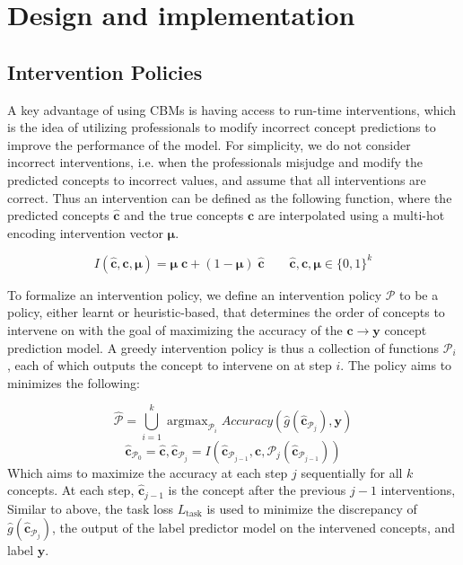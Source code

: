 \documentclass[../main.tex]{subfiles}
\begin{document}
\chapter{Design and implementation}


\section{Intervention Policies}

A key advantage of using CBMs is having access to 
run-time interventions, which is the idea of utilizing professionals
to modify incorrect concept predictions to improve the 
performance of the model.
For simplicity, we do not consider incorrect interventions, 
i.e. when the professionals misjudge and modify
 the predicted concepts to incorrect values,
and assume that
all interventions are correct. Thus an intervention
can be defined as the following function, where
the predicted concepts $\hat{\mathbf{c}}$ and the true concepts $\mathbf{c}$ are interpolated
using a multi-hot encoding intervention vector $\bm{\mu}$.

\[I(\hat{\mathbf{c}}, \mathbf{c}, \bm{\mu}) = 
\bm{\mu} \; \mathbf{c} + (1 - \bm{\mu}) \; \hat{\mathbf{c}} \qquad \hat{\mathbf{c}}, \mathbf{c}, \bm{\mu} \in \{0, 1\}^k\]

To formalize an intervention policy, we define an intervention policy $\mathcal{P}$ 
to be a policy, either learnt
or heuristic-based, that determines the order of concepts to intervene 
on with the goal of maximizing the accuracy of the $\mathbf{c} \to \mathbf{y}$ concept prediction model.
A greedy intervention policy is thus a collection of functions $\mathcal{P}_i$, each
of which outputs the concept to intervene on at step $i$. The policy aims to minimizes 
the following:

\[\hat{\mathcal{P}} = \bigcup_{i=1}^k \mathop{\mathrm{argmax}}_{\mathcal{P}_i} Accuracy(\hat{g}(\hat{\mathbf{c}}_{\mathcal{P}_j}), \mathbf{y}) \]
\[\hat{\mathbf{c}}_{\mathcal{P}_0} = \hat{\mathbf{c}}, \hat{\mathbf{c}}_{\mathcal{P}_j} = I(\hat{\mathbf{c}}_{\mathcal{P}_{j-1}}, \mathbf{c}, \mathcal{P}_j(\hat{\mathbf{c}}_{\mathcal{P}_{j-1}}))\]
Which aims to maximize the accuracy at each step $j$ sequentially
for all $k$ concepts. At each
step, $\hat{\mathbf{c}}_{j-1}$ is 
the concept after the previous $j-1$ interventions,
Similar to above, the task loss $L_{\text{task}}$ is used to minimize
the discrepancy of $\hat{g}(\hat{\mathbf{c}}_{\mathcal{P}_j})$, 
the output of the label predictor model on the intervened concepts,
and label $\mathbf{y}$.
\end{document}
